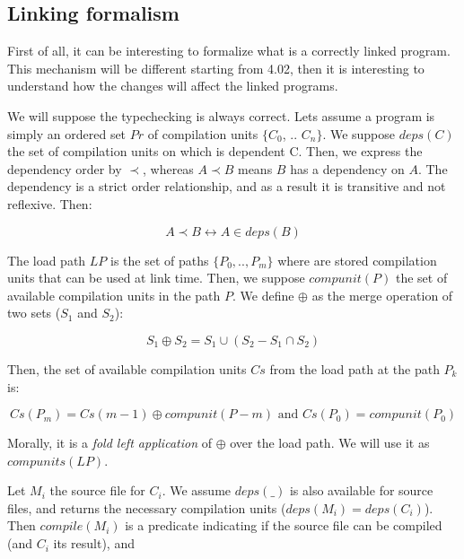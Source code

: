 \documentclass[11pt,a4paper]{article}
\begin{document}
\subsection{Linking formalism}

First of all, it can be interesting to formalize what is a correctly linked
program. This mechanism will be different starting from 4.02, then it is
interesting to understand how the changes will affect the linked programs.

We will suppose the typechecking is always correct. Lets assume a program is
simply an ordered set $Pr$ of compilation units $\{C_0$, .. $C_n\}$. We suppose
$deps(C)$ the set of compilation units on which is dependent C. Then, we express
the dependency order by $\prec$, whereas $A \prec B$ means $B$ has a dependency
on $A$. The dependency is a strict order relationship, and as a result it is
transitive and not reflexive. Then:

$$A \prec B \leftrightarrow A \in deps(B)$$



The load path $LP$ is the set of paths $\{P_0, .., P_m\}$ where are stored
compilation units that can be used at link time. Then, we suppose $compunit(P)$
the set of available compilation units in the path $P$. We define $\oplus$ as
the merge operation of two sets ($S_1$ and $S_2$):

$$S_1 \oplus S_2 = S_1 \cup (S_2 - S_1 \cap S_2) $$

Then, the set of available compilation units $Cs$ from the load path at the path
$P_k$ is: 

\begin{equation}
Cs(P_m) = Cs(m-1) \oplus compunit(P-m) \text{ and } Cs(P_0) = compunit(P_0)
\label{merge}
\end{equation}

Morally, it is a \emph{fold left application} of $\oplus$ over the load path. We
will use it as $compunits(LP)$.

Let $M_i$ the source file for $C_i$. We assume $deps(\_)$ is also available for
source files, and returns the necessary compilation units ($deps(M_i) =
deps(C_i)$). Then $compile(M_i)$ is a predicate indicating if the source file
can be compiled (and $C_i$ its result), and
\end{document}
